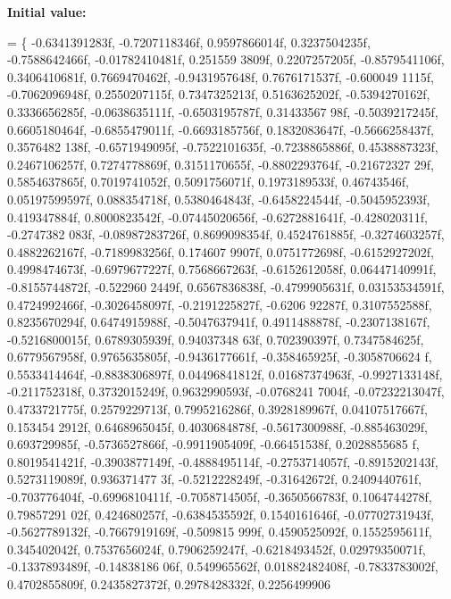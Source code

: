 {\bfseries Initial value\+:}
\begin{DoxyCode}
=
\{
    -0.6341391283f, -0.7207118346f, 0.9597866014f, 0.3237504235f, -0.7588642466f, -0.01782410481f, 0.251559
      3809f, 0.2207257205f, -0.8579541106f, 0.3406410681f, 0.7669470462f, -0.9431957648f, 0.7676171537f, -0.600049
      1115f, -0.7062096948f, 0.2550207115f,
    0.7347325213f, 0.5163625202f, -0.5394270162f, 0.3336656285f, -0.0638635111f, -0.6503195787f, 0.31433567
      98f, -0.5039217245f, 0.6605180464f, -0.6855479011f, -0.6693185756f, 0.1832083647f, -0.5666258437f, 0.3576482
      138f, -0.6571949095f, -0.7522101635f,
    -0.7238865886f, 0.4538887323f, 0.2467106257f, 0.7274778869f, 0.3151170655f, -0.8802293764f, -0.21672327
      29f, 0.5854637865f, 0.7019741052f, 0.5091756071f, 0.1973189533f, 0.46743546f, 0.05197599597f, 0.088354718f, 
      0.5380464843f, -0.6458224544f,
    -0.5045952393f, 0.419347884f, 0.8000823542f, -0.07445020656f, -0.6272881641f, -0.428020311f, -0.2747382
      083f, -0.08987283726f, 0.8699098354f, 0.4524761885f, -0.3274603257f, 0.4882262167f, -0.7189983256f, 0.174607
      9907f, 0.0751772698f, -0.6152927202f,
    0.4998474673f, -0.6979677227f, 0.7568667263f, -0.6152612058f, 0.06447140991f, -0.8155744872f, -0.522960
      2449f, 0.6567836838f, -0.4799905631f, 0.03153534591f, 0.4724992466f, -0.3026458097f, -0.2191225827f, -0.6206
      92287f, 0.3107552588f, 0.8235670294f,
    0.6474915988f, -0.5047637941f, 0.4911488878f, -0.2307138167f, -0.5216800015f, 0.6789305939f, 0.94037348
      63f, 0.702390397f, 0.7347584625f, 0.6779567958f, 0.9765635805f, -0.9436177661f, -0.358465925f, -0.3058706624
      f, 0.5533414464f, -0.8838306897f,
    0.04496841812f, 0.01687374963f, -0.9927133148f, -0.211752318f, 0.3732015249f, 0.9632990593f, -0.0768241
      7004f, -0.07232213047f, 0.4733721775f, 0.2579229713f, 0.7995216286f, 0.3928189967f, 0.04107517667f, 0.153454
      2912f, 0.6468965045f, 0.4030684878f,
    -0.5617300988f, -0.885463029f, 0.693729985f, -0.5736527866f, -0.9911905409f, -0.66451538f, 0.2028855685
      f, 0.8019541421f, -0.3903877149f, -0.4888495114f, -0.2753714057f, -0.8915202143f, 0.5273119089f, 0.936371477
      3f, -0.5212228249f, -0.31642672f,
    0.2409440761f, -0.703776404f, -0.6996810411f, -0.7058714505f, -0.3650566783f, 0.1064744278f, 0.79857291
      02f, 0.424680257f, -0.6384535592f, 0.1540161646f, -0.07702731943f, -0.5627789132f, -0.7667919169f, -0.509815
      999f, 0.4590525092f, 0.1552595611f,
    0.345402042f, 0.7537656024f, 0.7906259247f, -0.6218493452f, 0.02979350071f, -0.1337893489f, -0.14838186
      06f, 0.549965562f, 0.01882482408f, -0.7833783002f, 0.4702855809f, 0.2435827372f, 0.2978428332f, 0.2256499906

\end{DoxyCode}
